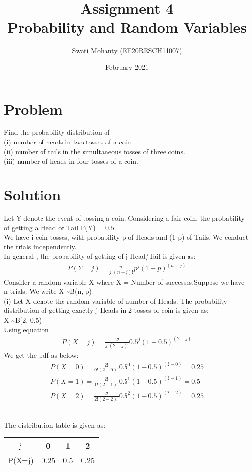 \documentclass[journal,12pt,twocolumn]{IEEEtran}
\title{Assignment 4
\\Probability and Random Variables }
\author{Swati Mohanty (EE20RESCH11007) }
\date{February 2021}
\begin{document}
\maketitle


\section{Problem}
Find the probability distribution of
\\(i) number of heads in two tosses of a coin.
\\(ii) number of tails in the simultaneous tosses
of three coins.
\\(iii) number of heads in four tosses of a coin.

\section{Solution}
Let Y denote the event of tossing a coin. Considering a fair coin, the probability of getting a Head or Tail P(Y) = 0.5
\\We have i coin tosses, with probability p of Heads and (1-p) of Tails. We
conduct the trials independently. 
\\In general , the probability of getting of j Head/Tail is given as:
\begin{align}
    P(Y = j) = \frac{n!}{j!(n-j)!} { p^j (1-p)^{(n-j)}}
\end{align}
Consider a random variable X where X = Number of successes.Suppose we have n trials. We write
X \textasciitilde B(n, p) 
\\(i)
Let X denote the random variable of number of Heads.
The probability distribution of getting exactly j Heads in 2 tosses of coin is given as:
\\X \textasciitilde B(2, 0.5) 
\\Using equation 
\begin{align}
    P(X = j) = \frac{2!}{j!(2-j)!} { 0.5^j (1-0.5)^{(2-j)}}
\end{align}
We get the pdf as below:
\begin{align}
    P(X=0) = \frac{2!}{0!(2-0)!} { 0.5^0 (1-0.5)^{(2-0)}}
    =0.25
    \\P(X=1) = \frac{2!}{1!(2-1)!} { 0.5^1 (1-0.5)^{(2-1)}} = 0.5
    \\P(X=2) = \frac{2!}{2!(2-2)!} { 0.5^2 (1-0.5)^{(2-2)}} = 0.25
\end{align}

\\The distribution table is given as:
\begin{center}
\begin{tabular}{ |c|c|c|c| } 
 \hline
 j & 0 & 1 & 2 \\\hline 
 P(X=j) & 0.25 &0.5 & 0.25 \\ 
 \hline
\end{tabular}
\end{center}
\end{document}
